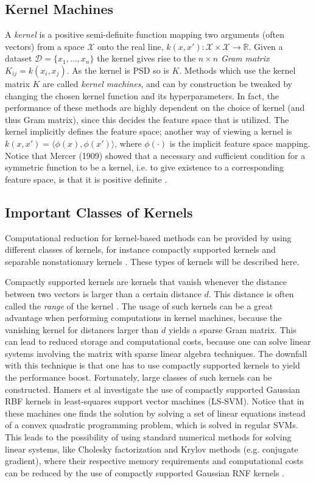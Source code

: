 \documentclass{article}
\theoremstyle{plain}
\theoremstyle{definition}
\theoremstyle{remark}
\begin{document}
\subsection{Kernel Machines}
A \textit{kernel} is a positive semi-definite function mapping two arguments (often vectors) from a space $\mathcal{X}$ onto the real line, $k(x,x'): \mathcal{X} \times \mathcal{X} \rightarrow \mathbb{R}$.
Given a dataset $\mathcal{D} = \{x_1, \hdots, x_n\}$ the kernel gives rise to the $n \times n$ \textit{Gram matrix} $K_{ij} = k(x_i, x_j)$.
As the kernel is PSD so is $K$.
Methods which use the kernel matrix $K$ are called \textit{kernel machines}, and can by construction be tweaked by changing the chosen kernel function and its hyperparameters. In fact, the performance of these methods are highly dependent on the choice of kernel (and thus Gram matrix), since this decides the feature space that is utilized. The kernel implicitly defines the feature space; another way of viewing a kernel is $k(x,x') = \langle \phi (x), \phi (x') \rangle$, where $\phi (\cdot)$ is the implicit feature space mapping. Notice that Mercer (1909) showed that a necessary and sufficient condition for a symmetric function to be a kernel, i.e. to give existence to a corresponding feature space, is that it is positive definite \cite{genton}.

\subsection{Important Classes of Kernels}

Computational reduction for kernel-based methods can be provided by using different classes of kernels, for instance compactly supported kernels and separable nonstationary kernels \cite{genton}. These types of kernels will be described here. 

Compactly supported kernels are kernels that vanish whenever the distance between two vectors is larger than a certain distance $d$. This distance is often called the \textit{range} of the kernel \cite{genton}. The usage of such kernels can be a great advantage when performing computations in kernel machines, because the vanishing kernel for distances larger than $d$ yields a sparse Gram matrix. This can lead to reduced storage and computational costs, because one can solve linear systems involving the matrix with sparse linear algebra techniques. The downfall with this technique is that one has to use compactly supported kernels to yield the performance boost. Fortunately, large classes of such kernels can be constructed. Hamers et al \cite{hamers} investigate the use of compactly supported Gaussian RBF kernels in least-squares support vector machines (LS-SVM). Notice that in these machines one finds the solution by solving a set of linear equations instead of a convex quadratic programming problem, which is solved in regular SVMs. This leads to the possibility of using standard numerical methods for solving linear systems, like Cholesky factorization and Krylov methods (e.g. conjugate gradient), where their respective memory requirements and computational costs can be reduced by the use of compactly supported Gaussian RNF kernels \cite{hamers}.
\end{document}

